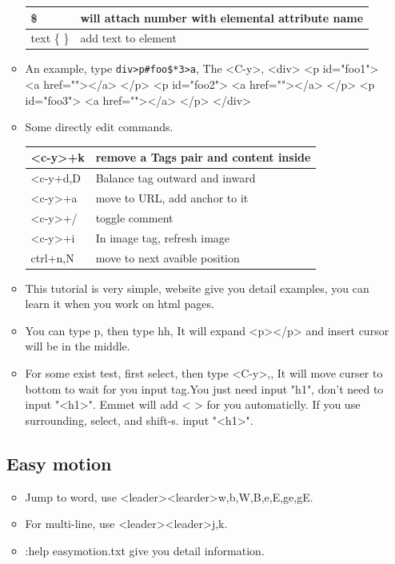 \documentclass[a4paper,12pt,twoside]{book}
\begin{document}
\begin{itemize}
\begin{itemize}
\begin{tabular}{p{}|p{}}
\hline 
\$ & will attach number with elemental attribute name   \\

\hline
text \{ \} & add text to element \\
\hline
\end{tabular}

\item An example, type \verb=div>p#foo$*3>a=, The <C-y>, 
 <div>
       <p id="foo1">
		   <a href=""></a>
	   </p>
	   <p id="foo2">
		   <a href=""></a>
	   </p>
	   <p id="foo3">
		   <a href=""></a>
	   </p>
</div>

\item Some directly edit commands. \\

\begin{tabular}{p{}|p{}}
\hline 
<c-y>+k  & remove a Tags pair and content inside \\

\hline 
<c-y+d,D & Balance tag outward and inward  \\

\hline 
<c-y>+a & move to URL, add anchor to it \\

\hline
<c-y>+/ & toggle comment \\

\hline 
<c-y>+i & In image tag, refresh image \\

\hline
ctrl+n,N & move to next avaible position \\
\hline 
\end{tabular}

\item This tutorial is very simple, website give you detail examples, you can learn it when you work on html pages. 

\item You can type p, then type hh, It will expand <p></p> and insert cursor will be in the middle. 

\item For some exist test, first select, then type <C-y>,, It will move curser to bottom to wait for you input tag.You just need input "h1", don't need to input "<h1>". Emmet will add < > for you automaticlly. If you use surrounding, select, and shift-s. input "<h1>". 


\end{itemize}

\subsection{Easy motion}
\begin{itemize}
		\item Jump to word, use <leader><learder>w,b,W,B,e,E,ge,gE. 
		\item For multi-line, use <leader><leader>j,k.  
		\item :help easymotion.txt give you detail information.
\end{itemize}


\end{itemize}
\end{document}
